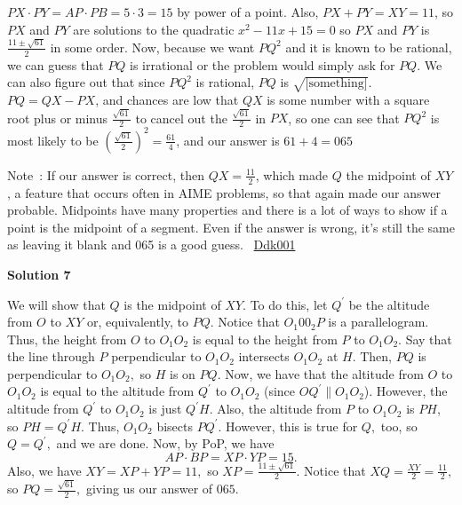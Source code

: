 \begin{enumerate}
$PX \cdot PY=AP \cdot PB=5 \cdot 3=15$ by power of a point. Also, $PX+PY=XY=11$, so $PX$ and $PY$ are solutions to the quadratic $x^2-11x+15=0$ so $PX$ and $PY$ is $\frac{11\pm\sqrt{61}}{2}$ in some order. Now, because we want $PQ^2$ and it is known to be rational, we can guess that $PQ$ is irrational or the problem would simply ask for $PQ$. We can also figure out that since $PQ^2$ is rational, $PQ$ is $\sqrt{\text{[something]}}$. $PQ=QX-PX$, and chances are low that $QX$ is some number with a square root plus or minus $\frac{\sqrt{61}}{2}$ to cancel out the $\frac{\sqrt{61}}{2}$ in $PX$, so one can see that $PQ^2$ is most likely to be $\left(\frac{\sqrt{61}}{2}\right)^2=\frac{61}{4}$, and our answer is $61+4=\boxed{065}$

 Note : If our answer is correct, then $QX=\frac{11}{2}$, which made $Q$ the midpoint of $XY$, a feature that occurs often in AIME problems, so that again made our answer probable. Midpoints have many properties and there is a lot of ways to show if a point is the midpoint of a segment. Even if the answer is wrong, it's still the same as leaving it blank and 065 is a good guess. ~\href{https://artofproblemsolving.com/wiki/index.php?title=Ddk001}{Ddk001}

 



\textbf{Solution 7}

We will show that $Q$ is the midpoint of $XY.$ To do this, let $Q^{\prime}$ be the altitude from $O$ to $XY$ or, equivalently, to $PQ.$ Notice that $O_{1}00_{2}P$ is a parallelogram. Thus, the height from $O$ to $O_{1}O_{2}$ is equal to the height from $P$ to $O_{1}O_{2}.$ Say that the line through $P$ perpendicular to $O_{1}O_{2}$ intersects $O_{1}O_{2}$ at $H.$ Then, $PQ$ is perpendicular to $O_{1}O_{2},$ so $H$ is on $PQ.$ Now, we have that the altitude from $O$ to $O_{1}O_{2}$ is equal to the altitude from $Q^{\prime}$ to $O_{1}O_{2}$ (since $OQ^{\prime} \parallel O_{1}O_{2}$). However, the altitude from $Q^{\prime}$ to $O_{1}O_{2}$ is just $Q^{\prime}H.$ Also, the altitude from $P$ to $O_{1}O_{2}$ is $PH$, so $PH = Q^{\prime}H.$ Thus, $O_{1}O_{2}$ bisects $PQ^{\prime}.$ However, this is true for $Q,$ too, so $Q = Q^{\prime},$ and we are done. Now, by PoP, we have 
 \[AP \cdot BP = XP \cdot YP = 15.\]Also, we have $XY = XP+YP = 11,$ so $XP = \frac{11 \pm \sqrt{61}}{2}$. Notice that $XQ = \frac{XY}{2} = \frac{11}{2},$ so $PQ = \frac{\sqrt{61}}{2},$ giving us our answer of $\boxed{065}.$





\end{enumerate}
